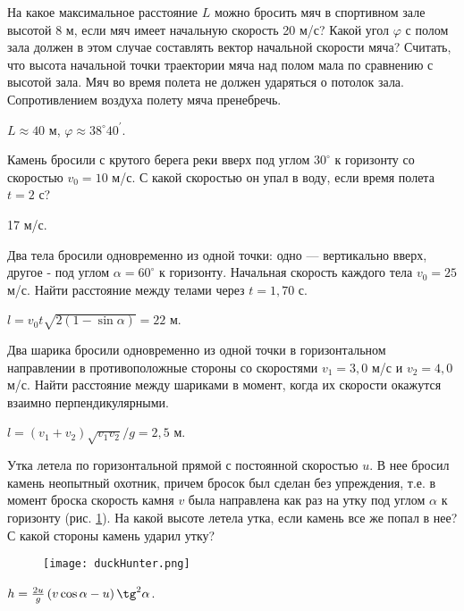 \begin{ex} %
На какое максимальное расстояние $L$ можно бросить мяч в спортивном зале высотой 8 м, если мяч имеет начальную скорость 20 м/с? Какой угол $\varphi$ с полом зала должен в этом случае составлять вектор начальной скорости мяча? Считать, что высота начальной точки траектории мяча над полом мала по сравнению с высотой зала. Мяч во время полета не должен ударяться о потолок зала. Сопротивлением воздуха полету мяча пренебречь.
\begin{ans}
$L \approx 40$ м, $\varphi \approx 38^{\circ}40^\prime$.
\end{ans}
\end{ex}	

\begin{ex} %
Камень бросили с крутого берега реки вверх под углом $30^{\circ}$ к горизонту со скоростью $v_0 = 10$ м/с. С какой скоростью он упал в воду, если время полета $t = 2$ с?
\begin{ans}
17 м/с.
\end{ans}
\end{ex}	

\begin{ex} %
Два тела бросили одновременно из одной точки: одно — вертикально вверх, другое - под углом $\alpha = 60^{\circ}$ к горизонту. Начальная скорость каждого тела $v_0 = 25$ м/с. Найти расстояние между телами через $t = 1,70$ с.
\begin{ans}
$l = v_0 t \sqrt{2(1-\sin \alpha)} = 22$ м.
\end{ans}
\end{ex}	

\begin{ex} %
Два шарика бросили одновременно из одной точки в горизонтальном направлении в противоположные стороны со скоростями $v_1 = 3,0$ м/с и $v_2 = 4,0$ м/с. Найти расстояние между шариками в момент, когда их скорости окажутся взаимно перпендикулярными.
\begin{ans}
$l = (v_1 + v_2)\sqrt{v_1 v_2}/g = 2,5$ м.
\end{ans}
\end{ex}	

\begin{ex} %
Утка летела по горизонтальной прямой с постоянной скоростью $u$. В нее бросил камень неопытный охотник, причем бросок был сделан без упреждения, т.е. в момент броска скорость камня $v$ была направлена как раз на утку под углом $\alpha$ к горизонту (рис. \ref{duckHunter}). На какой высоте летела утка, если камень все же попал в нее? С какой стороны камень ударил утку?

\begin{figure}
\centering
\texttt{[image: duckHunter.png]}
\caption{}
\label{duckHunter}
\end{figure}

\begin{ans}
$h = \frac{2u}{g}\left( v \cos \alpha - u \right) \tg^2 \alpha$.
\end{ans}
\end{ex}

